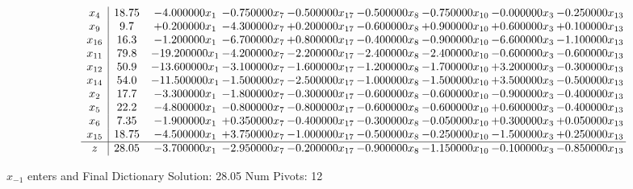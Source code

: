 \documentclass[10pt]{article}
\begin{document}
 \[\begin{array}{c| c c@{\hskip 2pt} c@{\hskip 2pt} c@{\hskip 2pt} c@{\hskip 2pt} c@{\hskip 2pt} c@{\hskip 2pt} c@{\hskip 2pt} }
 x_{4}   &  18.75 & -4.000000 x_{1} & -0.750000 x_{7} & -0.500000 x_{17} & -0.500000 x_{8} & -0.750000 x_{10} & -0.000000 x_{3} & -0.250000 x_{13}\\
 x_{9}   &  9.7 & + 0.200000 x_{1} & -4.300000 x_{7} & + 0.200000 x_{17} & -0.600000 x_{8} & + 0.900000 x_{10} & + 0.600000 x_{3} & + 0.100000 x_{13}\\
 x_{16}   &  16.3 & -1.200000 x_{1} & -6.700000 x_{7} & + 0.800000 x_{17} & -0.400000 x_{8} & -0.900000 x_{10} & -6.600000 x_{3} & -1.100000 x_{13}\\
 x_{11}   &  79.8 & -19.200000 x_{1} & -4.200000 x_{7} & -2.200000 x_{17} & -2.400000 x_{8} & -2.400000 x_{10} & -0.600000 x_{3} & -0.600000 x_{13}\\
 x_{12}   &  50.9 & -13.600000 x_{1} & -3.100000 x_{7} & -1.600000 x_{17} & -1.200000 x_{8} & -1.700000 x_{10} & + 3.200000 x_{3} & -0.300000 x_{13}\\
 x_{14}   &  54.0 & -11.500000 x_{1} & -1.500000 x_{7} & -2.500000 x_{17} & -1.000000 x_{8} & -1.500000 x_{10} & + 3.500000 x_{3} & -0.500000 x_{13}\\
 x_{2}   &  17.7 & -3.300000 x_{1} & -1.800000 x_{7} & -0.300000 x_{17} & -0.600000 x_{8} & -0.600000 x_{10} & -0.900000 x_{3} & -0.400000 x_{13}\\
 x_{5}   &  22.2 & -4.800000 x_{1} & -0.800000 x_{7} & -0.800000 x_{17} & -0.600000 x_{8} & -0.600000 x_{10} & + 0.600000 x_{3} & -0.400000 x_{13}\\
 x_{6}   &  7.35 & -1.900000 x_{1} & + 0.350000 x_{7} & -0.400000 x_{17} & -0.300000 x_{8} & -0.050000 x_{10} & + 0.300000 x_{3} & + 0.050000 x_{13}\\
 x_{15}   &  18.75 & -4.500000 x_{1} & + 3.750000 x_{7} & -1.000000 x_{17} & -0.500000 x_{8} & -0.250000 x_{10} & -1.500000 x_{3} & + 0.250000 x_{13}\\
\hline
z    &  28.05 & -3.700000 x_{1} & -2.950000 x_{7} & -0.200000 x_{17} & -0.900000 x_{8} & -1.150000 x_{10} & -0.100000 x_{3} & -0.850000 x_{13}\\
\end{array}\]


 $ x_{-1} $ enters and Final Dictionary
Solution:  28.05
Num Pivots:  12
\end{document}
